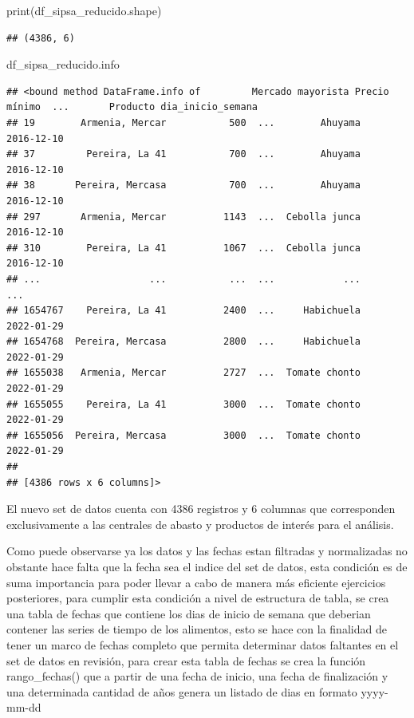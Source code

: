 \documentclass[
]{book}
\newenvironment{Shaded}{\begin{snugshade}}{\end{snugshade}}
\newcommand{\BuiltInTok}[1]{#1}
\newcommand{\NormalTok}[1]{#1}
\begin{document}
\begin{Shaded}
\begin{Highlighting}[]

\BuiltInTok{print}\NormalTok{(df\_sipsa\_reducido.shape)}
\end{Highlighting}
\end{Shaded}

\begin{verbatim}
## (4386, 6)
\end{verbatim}

\begin{Shaded}
\begin{Highlighting}[]
\NormalTok{df\_sipsa\_reducido.info}
\end{Highlighting}
\end{Shaded}

\begin{verbatim}
## <bound method DataFrame.info of         Mercado mayorista Precio mínimo  ...       Producto dia_inicio_semana
## 19        Armenia, Mercar           500  ...        Ahuyama        2016-12-10
## 37         Pereira, La 41           700  ...        Ahuyama        2016-12-10
## 38       Pereira, Mercasa           700  ...        Ahuyama        2016-12-10
## 297       Armenia, Mercar          1143  ...  Cebolla junca        2016-12-10
## 310        Pereira, La 41          1067  ...  Cebolla junca        2016-12-10
## ...                   ...           ...  ...            ...               ...
## 1654767    Pereira, La 41          2400  ...     Habichuela        2022-01-29
## 1654768  Pereira, Mercasa          2800  ...     Habichuela        2022-01-29
## 1655038   Armenia, Mercar          2727  ...  Tomate chonto        2022-01-29
## 1655055    Pereira, La 41          3000  ...  Tomate chonto        2022-01-29
## 1655056  Pereira, Mercasa          3000  ...  Tomate chonto        2022-01-29
## 
## [4386 rows x 6 columns]>
\end{verbatim}

El nuevo set de datos cuenta con 4386 registros y 6 columnas que corresponden exclusivamente a las centrales de abasto y productos de interés para el análisis.

Como puede observarse ya los datos y las fechas estan filtradas y normalizadas no obstante hace falta que la fecha sea el indice del set de datos, esta condición es de suma importancia para poder llevar a cabo de manera más eficiente ejercicios posteriores, para cumplir esta condición a nivel de estructura de tabla, se crea una tabla de fechas que contiene los dias de inicio de semana que deberian contener las series de tiempo de los alimentos, esto se hace con la finalidad de tener un marco de fechas completo que permita determinar datos faltantes en el set de datos en revisión, para crear esta tabla de fechas se crea la función rango\_fechas() que a partir de una fecha de inicio, una fecha de finalización y una determinada cantidad de años genera un listado de dias en formato yyyy-mm-dd
\end{document}
